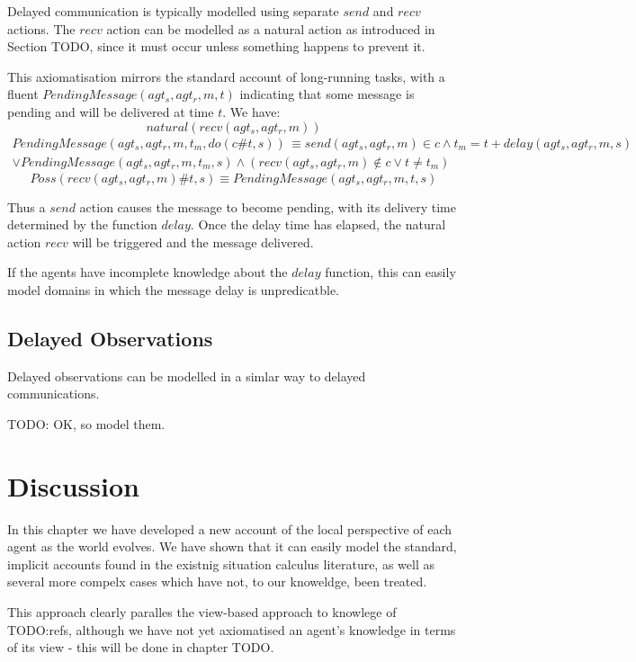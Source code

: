 Delayed communication is typically modelled using separate $send$
and $recv$ actions. The $recv$ action can be modelled as a natural
action as introduced in Section TODO, since it must occur unless something
happens to prevent it.

This axiomatisation mirrors the standard account of long-running tasks,
with a fluent $PendingMessage(agt_{s},agt_{r},m,t)$ indicating that
some message is pending and will be delivered at time $t$. We have:\[
natural(recv(agt_{s},agt_{r},m))\]
\begin{multline*}
PendingMessage(agt_{s},agt_{r},m,t_{m},do(c\#t,s))\,\equiv send(agt_{s},agt_{r},m)\in c\wedge t_{m}=t+delay(agt_{s},agt_{r},m,s)\\
\vee PendingMessage(agt_{s},agt_{r},m,t_{m},s)\wedge\left(recv(agt_{s},agt_{r},m)\not\in c\vee t\neq t_{m}\right)\end{multline*}
\[
Poss(recv(agt_{s},agt_{r},m)\#t,s)\equiv PendingMessage(agt_{s},agt_{r},m,t,s)\]


Thus a $send$ action causes the message to become pending, with its
delivery time determined by the function $delay$. Once the delay
time has elapsed, the natural action $recv$ will be triggered and
the message delivered.

If the agents have incomplete knowledge about the $delay$ function,
this can easily model domains in which the message delay is unpredicatble.


\subsection{Delayed Observations}

Delayed observations can be modelled in a simlar way to delayed communications.

TODO: OK, so model them.


\section{Discussion}

In this chapter we have developed a new account of the local perspective
of each agent as the world evolves. We have shown that it can easily
model the standard, implicit accounts found in the existnig situation
calculus literature, as well as several more compelx cases which have
not, to our knoweldge, been treated.

This approach clearly paralles the view-based approach to knowlege
of TODO:refs, although we have not yet axiomatised an agent's knowledge
in terms of its view - this will be done in chapter TODO.


